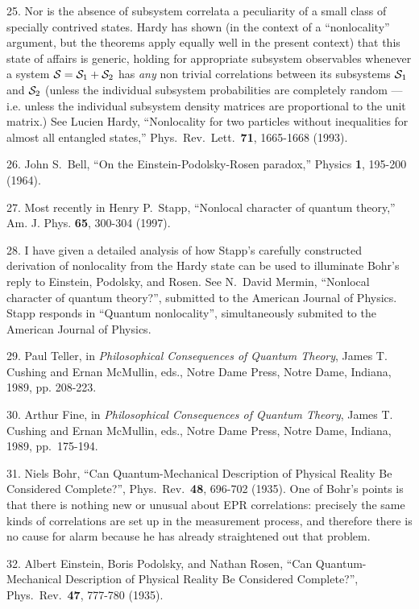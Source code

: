 25. Nor is the absence of subsystem correlata a peculiarity of a small
class of specially contrived states.  Hardy has shown (in the
context of a ``nonlocality'' argument, but the theorems apply equally
well in the present context) that this state of affairs is generic,
holding for appropriate subsystem observables whenever a system ${\cal S} =
{\cal S}_1 + {\cal S}_2$ has {\it any\/} non trivial correlations between its
subsystems ${\cal S}_1$ and ${\cal S}_2$ (unless the individual subsystem
probabilities are completely random --- i.e.  unless the individual
subsystem density matrices are proportional to the unit matrix.)
See Lucien Hardy, ``Nonlocality for two particles without inequalities for
almost all entangled states,'' Phys.~Rev.~Lett.~{\bf 71}, 1665-1668
(1993).

26. John S.~Bell, ``On the
Einstein-Podolsky-Rosen paradox,'' Physics {\bf 1}, 195-200 (1964).

27. Most recently in Henry P.~Stapp, ``Nonlocal character of quantum
theory,'' Am. J. Phys. {\bf 65}, 300-304 (1997).

28.  I have given a detailed analysis of how Stapp's carefully constructed
derivation of nonlocality from the Hardy state can be used
to illuminate Bohr's reply to Einstein, Podolsky, and Rosen.  See
N.~David Mermin, ``Nonlocal character of quantum theory?'', submitted
to the American Journal of Physics. Stapp responds in ``Quantum
nonlocality'', simultaneously submited to the American Journal of
Physics.

29. Paul Teller, in {\it Philosophical
Consequences of Quantum Theory\/}, James T. Cushing and Ernan
McMullin, eds., Notre Dame Press, Notre Dame, Indiana, 1989, pp.
208-223.

30.  Arthur Fine, in {\it Philosophical
Consequences of Quantum Theory\/}, James T. Cushing and Ernan
McMullin, eds., Notre Dame Press, Notre Dame, Indiana, 1989,
pp.~175-194.

31.  Niels
Bohr, ``Can Quantum-Mechanical Description of Physical Reality Be
Considered Complete?'', Phys.~Rev.~{\bf 48}, 696-702 (1935).  One of
Bohr's points is that there is nothing new or unusual about EPR
correlations:  precisely the same kinds of correlations are set up in
the measurement process, and therefore there is no cause for alarm
because he has already straightened out that problem.

32.  Albert Einstein, Boris Podolsky, and Nathan Rosen, ``Can
Quantum-Mechanical Description of Physical Reality Be Considered
Complete?'', Phys.~Rev.~{\bf 47}, 777-780 (1935).

